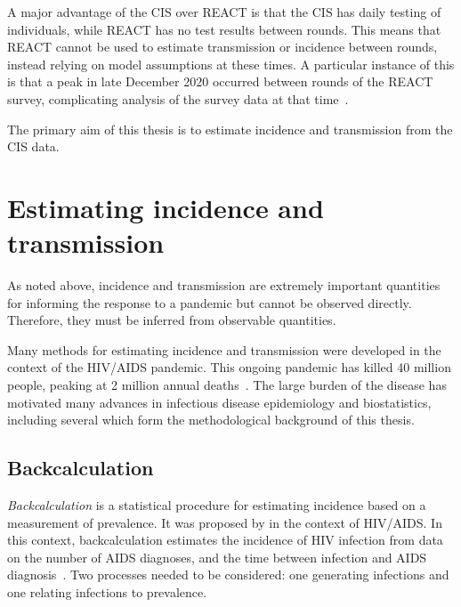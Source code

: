 \documentclass[thesis.tex]{subfiles}
\begin{document}
A major advantage of the CIS over REACT is that the CIS has daily testing of individuals, while REACT has no test results between rounds.
This means that REACT cannot be used to estimate transmission or incidence between rounds, instead relying on model assumptions at these times.
A particular instance of this is that a peak in late December 2020 occurred between rounds of the REACT survey, complicating analysis of the survey data at that time~\autocite{rileyREACTround8}.

The primary aim of this thesis is to estimate incidence and transmission from the CIS data.

\section{Estimating incidence and transmission} \label{intro:sec:estimating-incidence}

As noted above, incidence and transmission are extremely important quantities for informing the response to a pandemic but cannot be observed directly.
Therefore, they must be inferred from observable quantities.

Many methods for estimating incidence and transmission were developed in the context of the HIV/AIDS pandemic.
This ongoing pandemic has killed 40 million people, peaking at 2 million annual deaths~\autocite{unaids2023}.
The large burden of the disease has motivated many advances in infectious disease epidemiology and biostatistics, including several which form the methodological background of this thesis.

\subsection{Backcalculation} \label{intro:sec:backcalc}

\emph{Backcalculation} is a statistical procedure for estimating incidence based on a measurement of prevalence.
It was proposed by \textcite{brookmeyerMethod} in the context of HIV/AIDS.
In this context, backcalculation estimates the incidence of HIV infection from data on the number of AIDS diagnoses, and the time between infection and AIDS diagnosis~\autocite{brookmeyerBackcalculation,brookmeyerMeasuring}.
Two processes needed to be considered: one generating infections and one relating infections to prevalence.
\end{document}
